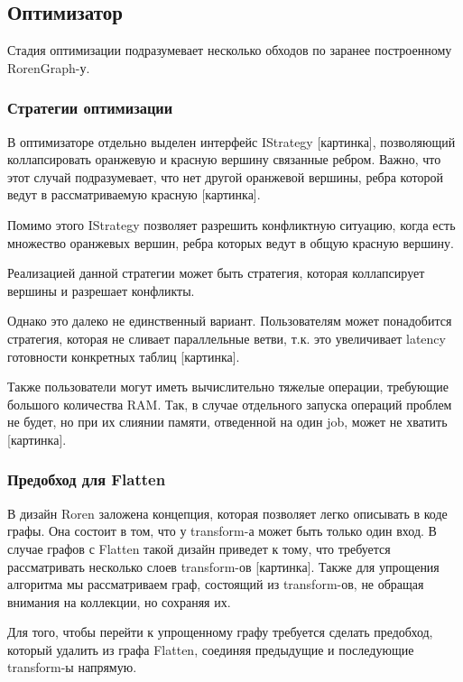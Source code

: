 \subsection{Оптимизатор}

Стадия оптимизации подразумевает несколько обходов по заранее построенному RorenGraph-у.

\subsubsection{Стратегии оптимизации}

В оптимизаторе отдельно выделен интерфейс IStrategy [картинка], позволяющий коллапсировать оранжевую и красную вершину связанные ребром. Важно, что этот случай подразумевает, что нет другой оранжевой вершины, ребра которой ведут в рассматриваемую красную [картинка].

Помимо этого IStrategy позволяет разрешить конфликтную ситуацию, когда есть множество оранжевых вершин, ребра которых ведут в общую красную вершину.

Реализацией данной стратегии может быть стратегия, которая коллапсирует вершины и разрешает конфликты.

Однако это далеко не единственный вариант. Пользователям может понадобится стратегия, которая не сливает параллельные ветви, т.к. это увеличивает latency готовности конкретных таблиц [картинка].

Также пользователи могут иметь вычислительно тяжелые операции, требующие большого количества RAM. Так, в случае отдельного запуска операций проблем не будет, но при их слиянии памяти, отведенной на один job, может не хватить [картинка].

\newpage
\subsubsection{Предобход для Flatten}

В дизайн Roren заложена концепция, которая позволяет легко описывать в коде графы. Она состоит в том, что у transform-а может быть только один вход. В случае графов с Flatten такой дизайн приведет к тому, что требуется рассматривать несколько слоев transform-ов [картинка]. Также для упрощения алгоритма мы рассматриваем граф, состоящий из transform-ов, не обращая внимания на коллекции, но сохраняя их.

Для того, чтобы перейти к упрощенному графу требуется сделать предобход, который удалить из графа Flatten, соединяя предыдущие и последующие transform-ы напрямую.
